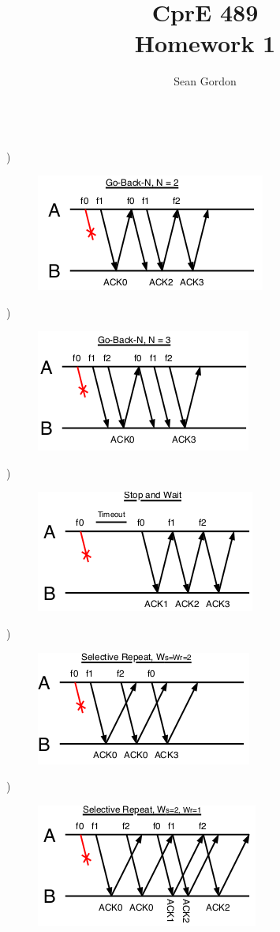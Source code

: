 \documentclass[12pt]{article}
\title{CprE 489\\Homework 1}
\author{Sean Gordon}
\begin{document}
\maketitle


\hrulefill \\


)
\begin{figure}[h!]
  \centering
  \includegraphics[scale=.8]{GBN2.png}
\end{figure}

)
\begin{figure}[h!]
  \centering
  \includegraphics[scale=.8]{GBN3.png}
\end{figure}

\pagebreak

)
\begin{figure}[h!]
  \centering
  \includegraphics[scale=.8]{SnW.png}
\end{figure}

)
\begin{figure}[h!]
  \centering
  \includegraphics[scale=.8]{SR_WsWr2.png}
\end{figure}

)
\begin{figure}[h!]
  \centering
  \includegraphics[scale=.8]{SR_Ws2Wr1.png}
\end{figure}
\end{document}
